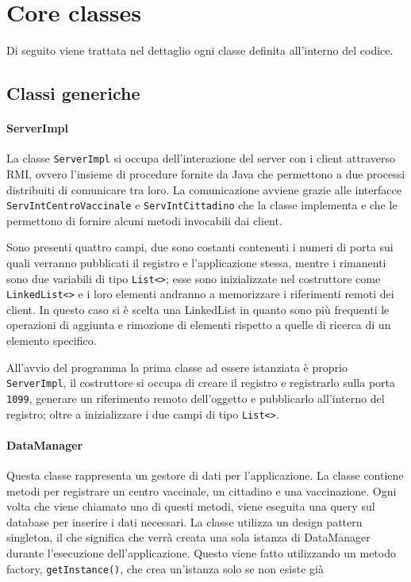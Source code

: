 \section{Core classes}
	Di seguito viene trattata nel dettaglio ogni classe definita all'interno del codice.

\subsection{Classi generiche}

	\paragraph{ServerImpl}
	La classe \verb|ServerImpl| si occupa dell'interazione del server con i client attraverso RMI, ovvero l'insieme di procedure fornite da Java che permettono a due processi distribuiti di comunicare tra loro.
	La comunicazione avviene grazie alle interfacce \verb|ServIntCentroVaccinale| e \verb|ServIntCittadino| che la classe implementa e che le permettono di fornire alcuni metodi invocabili dai client.
	
	Sono presenti quattro campi, due sono costanti contenenti i numeri di porta sui quali verranno pubblicati il registro e l'applicazione stessa, mentre i rimanenti sono due variabili di tipo \verb|List<>|;  esse sono inizializzate nel costruttore come \verb|LinkedList<>| e i loro elementi andranno a memorizzare i riferimenti remoti dei client.
	In questo caso si è scelta una LinkedList in quanto sono più frequenti le operazioni di aggiunta e rimozione di elementi rispetto a quelle di ricerca di un elemento specifico.	
	
	All'avvio del programma la prima classe ad essere istanziata è proprio \verb|ServerImpl|, il costruttore si occupa di creare il registro e registrarlo sulla porta \verb|1099|, generare un riferimento remoto dell'oggetto e pubblicarlo all'interno del registro; oltre a inizializzare i due campi di tipo \verb|List<>|.
	
	
	\paragraph{DataManager}
	Questa classe rappresenta un gestore di dati per l’applicazione.
	La classe contiene metodi per registrare un centro vaccinale, un cittadino e una vaccinazione.
	Ogni volta che viene chiamato uno di questi metodi, viene eseguita una query sul database per inserire i dati necessari.
	La classe utilizza un design pattern singleton, il che significa che verrà creata una sola istanza di DataManager durante l'esecuzione dell'applicazione.
	Questo viene fatto utilizzando un metodo factory, \verb|getInstance()|, che crea un'istanza solo se non esiste già
	
